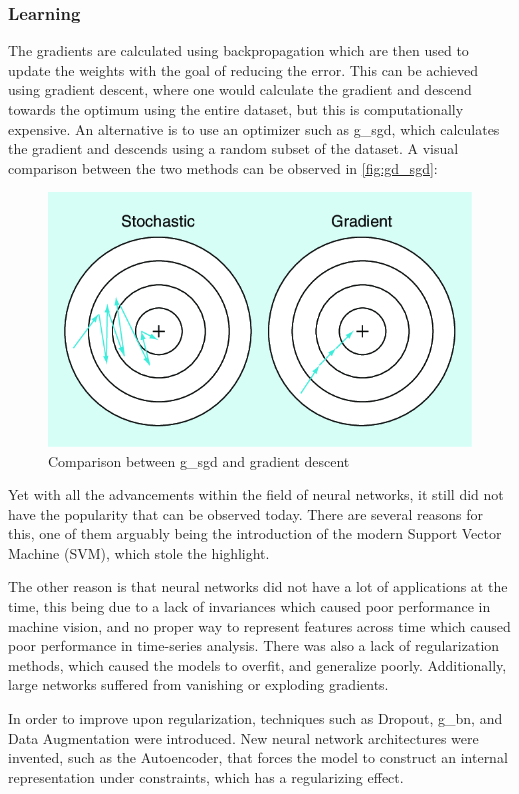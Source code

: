 \subsubsection{Learning}
The gradients are calculated using backpropagation which are then used to update the weights with the goal of reducing the error. This can be achieved using gradient descent, where one would calculate the gradient and descend towards the optimum using the entire dataset, but this is computationally expensive. An alternative is to use an optimizer such as \gls*{g_sgd}\cite{sgd}, which calculates the gradient and descends using a random subset of the dataset. A visual comparison between the two methods can be observed in \autoref{fig:gd_sgd}:
\begin{figure}[H]
    \centering
    \includegraphics[width=0.8\linewidth]{resources/related_works/gradient_descent.png}
    \caption{Comparison between \gls*{g_sgd} and gradient descent \cite{gradient_descent}}
    \label{fig:gd_sgd}
\end{figure}
\par
Yet with all the advancements within the field of neural networks, it still did not have the popularity that can be observed today. There are several reasons for this, one of them arguably being the introduction of the modern Support Vector Machine (SVM)\cite{svm}, which stole the highlight.
\par
The other reason is that neural networks did not have a lot of applications at the time, this being due to a lack of invariances which caused poor performance in machine vision, and no proper way to represent features across time which caused poor performance in time-series analysis. There was also a lack of regularization methods, which caused the models to overfit, and generalize poorly. Additionally, large networks suffered from vanishing or exploding gradients.
\par
In order to improve upon regularization, techniques such as Dropout\cite{dropout}, \gls*{g_bn}\cite{batchnorm}, and Data Augmentation\cite{data_augmentation} were introduced. New neural network architectures were invented, such as the Autoencoder\cite{autoencoder}, that forces the model to construct an internal representation under constraints, which has a regularizing effect.
